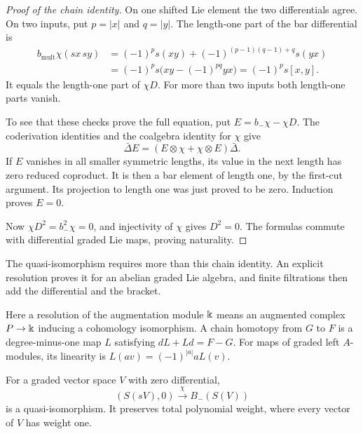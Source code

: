 \begin{proof}[Proof of the chain identity]
On one shifted Lie element the two differentials agree.
On two inputs, put $p=|x|$ and $q=|y|$.
The length-one part of the bar differential is
\begin{align*}
 b_{\mathrm{mult}}\chi(sx\,sy)
 &=(-1)^p s(xy)
   +(-1)^{(p-1)(q-1)+q}s(yx)\\
 &=(-1)^p s\bigl(xy-(-1)^{pq}yx\bigr)
  =(-1)^p s[x,y].
\end{align*}
It equals the length-one part of $\chi D$.
For more than two inputs both length-one parts vanish.

To see that these checks prove the full equation, put
$E=b_-\chi-\chi D$.
The coderivation identities and the coalgebra identity for
$\chi$ give
\[
 \bar\Delta E=(E\otimes\chi+\chi\otimes E)\bar\Delta.
\]
If $E$ vanishes in all smaller symmetric lengths, its value in
the next length has zero reduced coproduct.
It is then a bar element of length one, by the first-cut argument.
Its projection to length one was just proved to be zero.
Induction proves $E=0$.

Now $\chi D^2=b_-^2\chi=0$, and injectivity of $\chi$ gives
$D^2=0$.  The formulas commute with differential graded Lie
maps, proving naturality.
\end{proof}

The quasi-isomorphism requires more than this chain identity.
An explicit resolution proves it for an abelian graded Lie
algebra, and finite filtrations then add the differential and
the bracket.

Here a resolution of the augmentation module $\Bbbk$ means an
augmented complex $P\to \Bbbk$ inducing a cohomology isomorphism.
A chain homotopy from $G$ to $F$ is a degree-minus-one map $L$
satisfying $dL+Ld=F-G$.  For maps of graded left $A$-modules,
its linearity is $L(av)=(-1)^{|a|}aL(v)$.

\begin{lemma}
\label{lem:olb-abelian-bar}
For a graded vector space $V$ with zero differential,
\[
 (S(sV),0)\xrightarrow{\chi}B_-(S(V))
\]
is a quasi-isomorphism.  It preserves total polynomial weight,
where every vector of $V$ has weight one.
\end{lemma}

